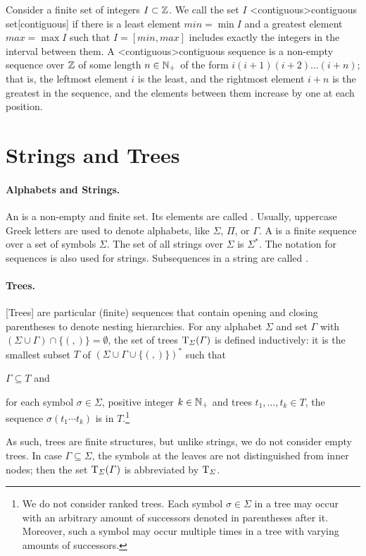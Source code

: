 \documentclass[../document.tex]{subfiles}
\begin{document}
    Consider a finite set of integers \(I \subset \mathbb{Z}\).
    We call the set \(I\) <contiguous>{contiguous set}[contiguous] if there is a least element \(\mathit{min} = \min I\) and a greatest element \(\mathit{max} = \max I\) such that \(I = [\mathit{min}, \mathit{max}]\) includes exactly the integers in the interval between them.
    A <contiguous>{contiguous sequence} is a non-empty sequence over \(\mathbb{Z}\) of some length \(n \in \mathbb{N}_+\) of the form \(i (i+1) (i+2) \ldots (i+n)\); that is, the leftmost element \(i\) is the least, and the rightmost element \(i+n\) is the greatest in the sequence, and the elements between them increase by one at each position.

    \section{Strings and Trees}\label{sec:preliminaries:trees}
    \paragraph{Alphabets and Strings.}
    An  is a non-empty and finite set. Its elements are called .
    Usually, uppercase Greek letters are used to denote alphabets, like \(\varSigma\), \(\varPi\), or \(\varGamma\).
    A  is a finite sequence over a set of symbols \(\varSigma\).
    The set of all strings over \(\varSigma\) is \(\varSigma^*\).
    The notation for sequences is also used for strings.
    Subsequences in a string are called .

    \paragraph{Trees.}
    [Trees] are particular (finite) sequences that contain opening and closing parentheses to denote nesting hierarchies.
    For any alphabet \(\varSigma\) and set \(\varGamma\) with \((\varSigma \cup \varGamma) \cap \{(,)\} = \emptyset\), the set of trees \(\operatorname{T}_\varSigma(\varGamma)\) is defined inductively: it is the smallest subset \(T\) of \((\varSigma \cup \varGamma \cup \{ (, )\})^*\) such that
    \begin{inparaenum}
        \item \(\varGamma \subseteq T\) and
        \item for each symbol \(\sigma \in \varSigma\), positive integer \(k \in \mathbb{N}_+\) and trees \(t_1, \ldots, t_k \in T\), the sequence \(\sigma(t_1 \cdots t_k)\) is in \(T\).\footnote{
            We do not consider ranked trees.
            Each symbol \(\sigma \in \varSigma\) in a tree may occur with an arbitrary amount of successors denoted in parentheses after it.
            Moreover, such a symbol may occur multiple times in a tree with varying amounts of successors.
        }
    \end{inparaenum}
    As such, trees are finite structures, but unlike strings, we do not consider empty trees.
    In case \(\varGamma \subseteq \varSigma\), the symbols at the leaves are not distinguished from inner nodes; then the set \(\operatorname{T}_\varSigma(\varGamma)\) is abbreviated by \(\operatorname{T}_\varSigma\).
\end{document}
